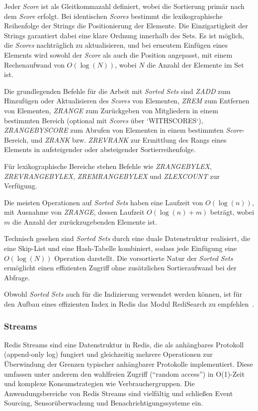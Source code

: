Jeder \emph{Score} ist als Gleitkommazahl definiert, wobei die Sortierung primär nach dem \emph{Score} erfolgt. Bei identischen \emph{Scores} bestimmt die lexikographische Reihenfolge der Strings die Positionierung der Elemente. Die Einzigartigkeit der Strings garantiert dabei eine klare Ordnung innerhalb des Sets. Es ist möglich, die \emph{Scores} nachträglich zu aktualisieren, und bei erneutem Einfügen eines Elements wird sowohl der \emph{Score} als auch die Position angepasst, mit einem Rechenaufwand von \(O(\log(N))\), wobei \(N\) die Anzahl der Elemente im Set ist.

Die grundlegenden Befehle für die Arbeit mit \emph{Sorted Sets} sind \emph{ZADD} zum Hinzufügen oder Aktualisieren des \emph{Scores} von Elementen, \emph{ZREM} zum Entfernen von Elementen, \emph{ZRANGE} zum Zurückgeben von Mitgliedern in einem bestimmten Bereich (optional mit \emph{Scores} über `WITHSCORES`), \emph{ZRANGEBYSCORE} zum Abrufen von Elementen in einem bestimmten \emph{Score}-Bereich, und \emph{ZRANK} bzw. \emph{ZREVRANK} zur Ermittlung des Rangs eines Elements in aufsteigender oder absteigender Sortierreihenfolge.

Für lexikographische Bereiche stehen Befehle wie \emph{ZRANGEBYLEX}, \emph{ZREVRANGEBYLEX}, \emph{ZREMRANGEBYLEX} und \emph{ZLEXCOUNT} zur Verfügung.

Die meisten Operationen auf \emph{Sorted Sets} haben eine Laufzeit von \(O(\log(n))\), mit Ausnahme von \emph{ZRANGE}, dessen Laufzeit \(O(\log(n) + m)\) beträgt, wobei \(m\) die Anzahl der zurückzugebenden Elemente ist.

Technisch gesehen sind \emph{Sorted Sets} durch eine duale Datenstruktur realisiert, die eine Skip-List und eine Hash-Tabelle kombiniert, sodass jede Einfügung eine \(O(\log(N))\) Operation darstellt. Die vorsortierte Natur der \emph{Sorted Sets} ermöglicht einen effizienten Zugriff ohne zusätzlichen Sortieraufwand bei der Abfrage.

Obwohl \emph{Sorted Sets} auch für die Indizierung verwendet werden können, ist für den Aufbau eines effizienten Index in Redis das Modul RediSearch zu empfehlen~\cite{redis_ltd_sorted-sets_nodate}.


\subsubsection{Streams}
Redis Streams sind eine Datenstruktur in Redis, die als anhängbares Protokoll (append-only log) fungiert und gleichzeitig mehrere Operationen zur Überwindung der Grenzen typischer anhängbarer Protokolle implementiert. Diese umfassen unter anderem den wahlfreien Zugriff (\enquote{random access}) in O(1)-Zeit und komplexe Konsumstrategien wie Verbrauchergruppen.
Die Anwendungsbereiche von Redis Streams sind vielfältig und schließen Event Sourcing, Sensorüberwachung und Benachrichtigungssysteme ein.

